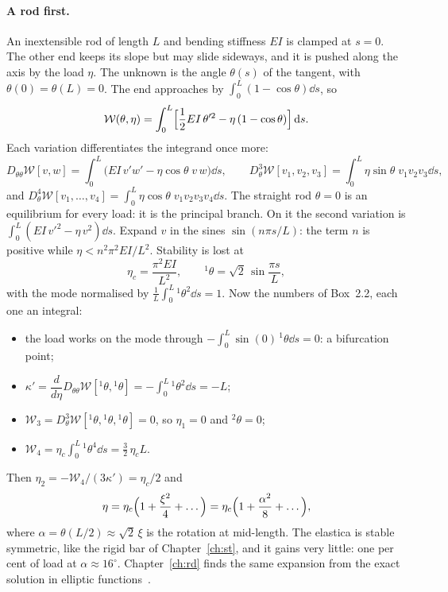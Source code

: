 \paragraph{A rod first.}
%
An inextensible rod of length $L$ and bending stiffness $EI$ is clamped at $s = 0$. The
other end keeps its slope but may slide sideways, and it is pushed along the axis by the
load $\eta$. The unknown is the angle $\theta(s)$ of the tangent, with
$\theta(0) = \theta(L) = 0$. The end approaches by $\displaystyle\int_0^L (1 - \cos\theta)\dd s$, so
\begin{equation}\label{eq:nc-elastica-energy}
  \mathcal{W}(\theta,\eta) = \int_0^L \Bigl[\frac12 EI\,\theta'^2 - \eta\,(1 - \cos\theta)\Bigr]\,\mathrm{d} s .
\end{equation}
Each variation differentiates the integrand once more:
\begin{equation}\label{eq:nc-elastica-var}
  D_{\theta\theta}\mathcal{W}[v,w] = \int_0^L \bigl(EI\,v'w' - \eta\cos\theta\; v\,w\bigr)\dd s,
  \qquad
  D^3_{\theta}\mathcal{W}[v_1,v_2,v_3] = \int_0^L \eta\sin\theta\; v_1v_2v_3\dd s ,
\end{equation}
and $D^4_{\theta}\mathcal{W}[v_1,\dots,v_4] = \displaystyle\int_0^L \eta\cos\theta\; v_1v_2v_3v_4\dd s$.
The straight rod $\theta = 0$ is an equilibrium for every load: it is the principal branch.
On it the second variation is $\displaystyle\int_0^L (EI\,v'^2 - \eta\,v^2)\dd s$. Expand $v$ in the sines
$\sin(n\pi s/L)$: the term $n$ is positive while $\eta < n^2\pi^2EI/L^2$. Stability is lost at
\begin{equation}\label{eq:nc-elastica-crit}
  \eta_c = \frac{\pi^2EI}{L^2},
  \qquad
  {}^1\theta = \sqrt2\,\sin\frac{\pi s}{L},
\end{equation}
with the mode normalised by $\displaystyle\frac1L\int_0^L {}^1\theta^2\dd s = 1$. Now the numbers of Box~2.2,
each one an integral:
\begin{itemize}
  \item the load works on the mode through $-\displaystyle\int_0^L \sin(0)\,{}^1\theta\dd s = 0$: a bifurcation point;
  \item $\kappa' = \dfrac{d}{d\eta}D_{\theta\theta}\mathcal{W}[{}^1\theta,{}^1\theta] = -\displaystyle\int_0^L {}^1\theta^2\dd s = -L$;
  \item $\mathcal{W}_3 = D^3_\theta\mathcal{W}[{}^1\theta,{}^1\theta,{}^1\theta] = 0$, so $\eta_1 = 0$ and ${}^2\theta = 0$;
  \item $\mathcal{W}_4 = \eta_c\displaystyle\int_0^L {}^1\theta^4\dd s = \frac32\,\eta_c L$.
\end{itemize}
Then $\eta_2 = -\mathcal{W}_4/(3\kappa') = \eta_c/2$ and
\begin{equation}\label{eq:nc-elastica-koiter}
  \eta = \eta_c\Bigl(1 + \frac{\xi^2}{4} + \dots\Bigr)
  = \eta_c\Bigl(1 + \frac{\alpha^2}{8} + \dots\Bigr),
\end{equation}
where $\alpha = \theta(L/2) \approx \sqrt2\,\xi$ is the rotation at mid-length. The elastica is
stable symmetric, like the rigid bar of Chapter~\ref{ch:st}, and it gains very little:
one per cent of load at $\alpha \approx 16^\circ$. Chapter~\ref{ch:rd} finds the same
expansion from the exact solution in elliptic functions~\cite[pp.~85--89]{nc-triantafyllidis2011}.

